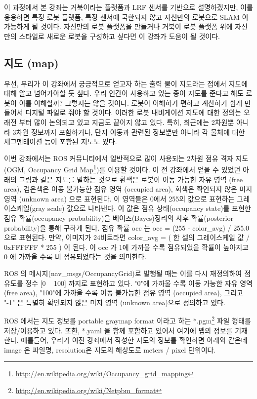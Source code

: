 이 과정에서 본 강좌는 거북이라는 플랫폼과 LRF 센서를 기반으로 설명하겠지만, 이를 응용하면 특정 로봇 플랫폼, 특정 센서에 국한되지 않고 자신만의 로봇으로 SLAM 이 가능하게 될 것이다. 자신만의 로봇 플랫폼을 만들거나 거북이 로봇 플랫폼 위에 자신만의 스타일로 새로운 로봇을 구성하고 싶다면 이 강좌가 도움이 될 것이다.

\subsection{지도 (map)}

우선, 우리가 이 강좌에서 궁긍적으로 얻고자 하는 출력 물이 지도라는 점에서 지도에 대해 알고 넘어가야할 듯 싶다. 우리 인간이 사용하고 있는 종이 지도를 준다고 해도 로봇이 이를 이해할까? 그렇지는 않을 것이다. 로봇이 이해하기 편하고 계산하기 쉽게 만들어서 디지털 파일로 줘야 할 것이다. 이러한 로봇 내비게이션 지도에 대한 정의는 오래전 부터 많이 논의되고 있고 지금도 끝이지 않고 있다. 특히, 최근에는 2차원뿐 아니라 3차원 정보까지 포함하거나, 단지 이동과 관련된 정보뿐만 아니라 각 물체에 대한 세그멘테이션 등이 포함된 지도도 있다.

이번 강좌에서는 ROS 커뮤니티에서 일반적으로 많이 사용되는 2차원 점유 격자 지도(OGM, Occupancy Grid Map\footnote{\url{http://en.wikipedia.org/wiki/Occupancy_grid_mapping}})를 이용할 것이다. 이 전 강좌에서 얻을 수 있었던 아래의 그림과 같은 지도를 말하는 것으로 흰색은 로봇이 이동 가능한 자유 영역 (free area), 검은색은 이동 불가능한 점유 영역 (occupied area), 회색은 확인되지 않은 미지 영역 (unknown area) 으로 표현된다. 이 영역들은 0에서 255의 값으로 표현하는 그레이스케일(gray scale) 값으로 나타낸다. 이 값은 점유 상태(occupancy state)를 표현한 점유 확률(occupancy probability)을 베이즈(Bayes)정리의 사후 확률(posterior probability)을 통해 구하게 된다. 점유 확률 occ 는 occ = (255 - color\_avg) / 255.0 으로 표현된다. 만약, 이미지가 24비트라면 color\_avg = ( 한 셀의 그레이스케일 값 / 0xFFFFFF * 255 ) 이 된다. 이 occ 가 1에 가까울 수록 점유되었을 확률이 높아지고 0 에 가까울 수록 비 점유되었다는 것을 의미한다.

ROS 의 메시지(nav\_msgs/OccupancyGrid)로 발행될 때는 이를 다시 재정의하여 점유도를 정수 [0 ~ 100] 까지로 표현하고 있다. "0"에 가까울 수록 이동 가능한 자유 영역 (free area), "100"에 가까울 수록 이동 불가능한 점유 영역 (occupied area), 그리고 "-1" 은 특별히 확인되지 않은 미지 영역 (unknown area)으로 정의하고 있다.


ROS 에서는 지도 정보를 portable graymap format 이라고 하는 *.pgm\footnote{\url{http://en.wikipedia.org/wiki/Netpbm_format}} 파일 형태를 저장/이용하고 있다. 또한, *.yaml 을 함께 포함하고 있어서 여기에 맵의 정보를 기재한다. 예를들어, 우리가 이전 강좌에서 작성한 지도의 정보를 확인하면 아래와 같은데 image 은 파일명, resolution은 지도의 해상도로 meters / pixel 단위이다.

